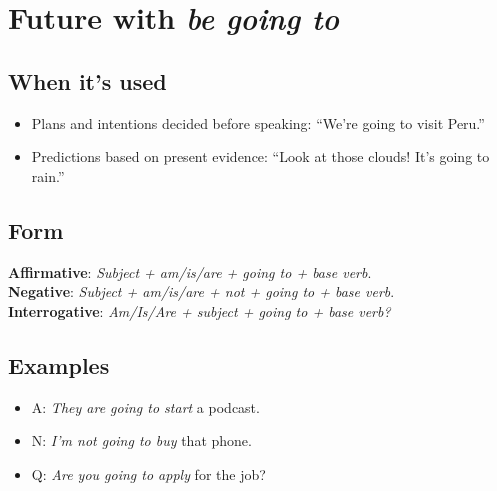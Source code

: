 \documentclass[11pt,a4paper]{article}
\begin{document}
\section{Future with \emph{be going to}}
\subsection*{When it’s used}
\begin{itemize}
  \item Plans and intentions decided before speaking: ``We’re going to visit Peru.''
  \item Predictions based on present evidence: ``Look at those clouds! It’s going to rain.''
\end{itemize}

\subsection*{Form}
\textbf{Affirmative}: \emph{Subject + am/is/are + going to + base verb}.\\
\textbf{Negative}: \emph{Subject + am/is/are + not + going to + base verb}.\\
\textbf{Interrogative}: \emph{Am/Is/Are + subject + going to + base verb?}

\subsection*{Examples}
\begin{itemize}
  \item A: \emph{They are going to start} a podcast.
  \item N: \emph{I’m not going to buy} that phone.
  \item Q: \emph{Are you going to apply} for the job?
\end{itemize}
\end{document}
